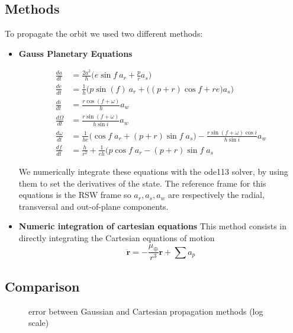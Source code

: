 \documentclass[11pt,a4paper]{report}
\renewcommand{\vec}[1]{\mathbf{#1}}
\begin{document}
\subsection{Methods}
To propagate the orbit we used two different methods:
\begin{itemize}
    \item \textbf{Gauss Planetary Equations}
    \par
    \begin{align*}
        \frac{da}{dt}&=\frac{2a^2}{h}\Big(e\sin f \: a_r +\frac{p}{r}a_s\Big)\\
        \frac{de}{dt}&=\frac{1}{h}\Big(p\sin(f) \: a_r+ \Big( (p+r)\cos f +re \Big) a_s\Big)\\
        \frac{di}{dt} &= \frac{r\cos(f+\omega)}{h}a_w\\
        \frac{d\Omega}{dt}&=\frac{r\sin (f+\omega) }{h \sin i}a_w\\
        \frac{d\omega}{dt}&=\frac{1}{he} \Big( \cos f \; a_r + (p+r)\sin f \; a_s \Big ) - \frac{r\sin(f+\omega)\cos i}{h\sin i} a_w\\
        \frac{df}{dt} &= \frac{h}{r^2} + \frac{1}{eh} \Big(p \cos f \; a_r - (p+r)\sin f \; a_s 
    \end{align*}

    \par
    We numerically integrate these equations with the ode113 solver, by using them to set the derivatives of the state.
    The reference frame for this equations is the RSW frame so $a_r, a_s, a_w$ are respectively the  radial, transversal and out-of-plane components. \cite{RSW_Curtis} \cite{RSW_Vallado} \cite{RSW_Battin}
    
    \item \textbf{Numeric integration of cartesian equations}
    This method consists in directly integrating the Cartesian equations of motion
    \begin{equation}
        \vec{\ddot{r}} = - \frac{\mu_{\oplus}}{r^3}\vec{r} + \sum{a_{p}}
    \end{equation}
    
\end{itemize}

\subsection{Comparison}
\par
\begin{figure}[H]
\centering
{}
    \caption{error between Gaussian and Cartesian propagation methods (log scale)}
\end{figure}
\end{document}
